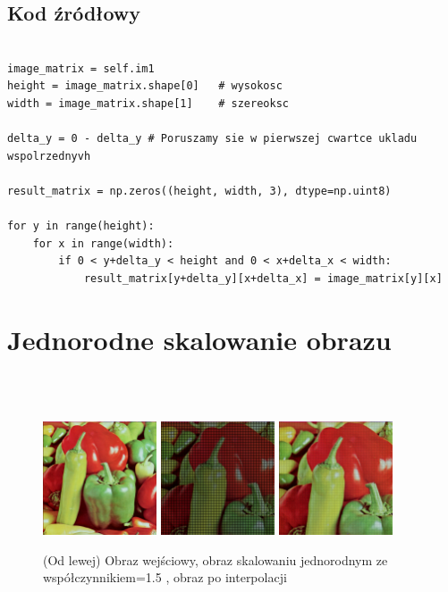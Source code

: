 \documentclass[final,a4paper,openany,12pt]{mwbk}
\begin{document}
\subsection*{Kod źródłowy}

\begin{lstlisting}[caption=Przemieszczenie obrazu o zadany wektor]

image_matrix = self.im1
height = image_matrix.shape[0]   # wysokosc
width = image_matrix.shape[1]    # szereoksc

delta_y = 0 - delta_y # Poruszamy sie w pierwszej cwartce ukladu wspolrzednyvh

result_matrix = np.zeros((height, width, 3), dtype=np.uint8)

for y in range(height):
    for x in range(width):  
        if 0 < y+delta_y < height and 0 < x+delta_x < width:
            result_matrix[y+delta_y][x+delta_x] = image_matrix[y][x]

\end{lstlisting}

\section{ Jednorodne skalowanie obrazu}

\hfill
\\\\
\indent

\begin{figure}[H]
	\begin{center}
		\includegraphics[width=0.3\textwidth]{1/1Geo_ScaleJ_Original}
		\includegraphics[width=0.3\textwidth]{1/1Geo_ScaleJ_Result}
		\includegraphics[width=0.3\textwidth]{1/1Geo_ScaleJ_Result_Interp}
	\end{center}
	\caption{(Od lewej) Obraz wejściowy, obraz skalowaniu jednorodnym ze współczynnikiem=1.5 , obraz po interpolacji }
\end{figure}
\end{document}
